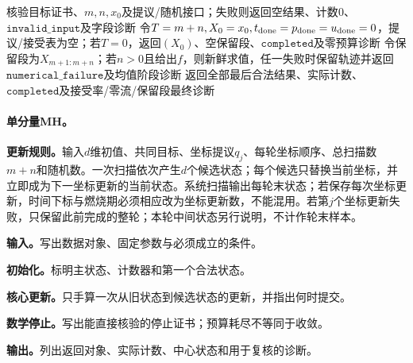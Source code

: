 \begin{AlgorithmContract}
\begin{algorithm}[tbp]
核验目标证书、$m,n,x_0$及提议/随机接口；失败则返回空结果、计数$0$、$\mathtt{invalid\_input}$及字段诊断\;
令$T=m+n,X_0=x_0,t_{\rm done}=p_{\rm done}=u_{\rm done}=0$，提议/接受表为空；若$T=0$，返回$(X_0)$、空保留段、$\mathtt{completed}$及零预算诊断\;
令保留段为$X_{m+1:m+n}$；若$n>0$且给出$f$，则新鲜求值，任一失败时保留轨迹并返回$\mathtt{numerical\_failure}$及均值阶段诊断\;
返回全部最后合法结果、实际计数、$\mathtt{completed}$及接受率/零流/保留段最终诊断\;
\end{algorithm}
\end{AlgorithmContract}
\endgroup

\paragraph{单分量MH。}
\textbf{更新规则。}输入$d$维初值、共同目标、坐标提议$q_j$、每轮坐标顺序、总扫描数$m+n$和随机数。一次扫描依次产生$d$个候选状态；每个候选只替换当前坐标，并立即成为下一坐标更新的当前状态。系统扫描输出每轮末状态；若保存每次坐标更新，时间下标与燃烧期必须相应改为坐标更新数，不能混用。若第$j$个坐标更新失败，只保留此前完成的整轮；本轮中间状态另行说明，不计作轮末样本。

\begingroup
{}

\begin{keypointbox}[title={固定顺序的单分量MH扫描：五步阅读}]
\textbf{输入。}写出数据对象、固定参数与必须成立的条件。\par
\textbf{初始化。}标明主状态、计数器和第一个合法状态。\par
\textbf{核心更新。}只手算一次从旧状态到候选状态的更新，并指出何时提交。\par
\textbf{数学停止。}写出能直接核验的停止证书；预算耗尽不等同于收敛。\par
\textbf{输出。}列出返回对象、实际计数、中心状态和用于复核的诊断。
\end{keypointbox}

